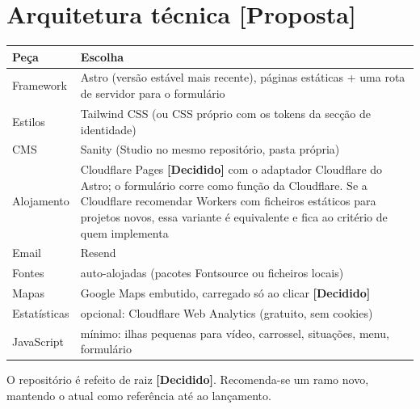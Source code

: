 \documentclass[11pt,a4paper]{article}
\newcommand{\decidido}{\textcolor{verde700}{\textbf{[Decidido]}}}
\newcommand{\proposta}{\textcolor{bronze}{\textbf{[Proposta]}}}
\begin{document}
\section{Arquitetura técnica \proposta}
\begin{center}
\begin{tabularx}{\textwidth}{lX}
\toprule
\textbf{Peça} & \textbf{Escolha} \\
\midrule
Framework & Astro (versão estável mais recente), páginas estáticas + uma rota de servidor para o formulário \\
Estilos & Tailwind CSS (ou CSS próprio com os tokens da secção de identidade) \\
CMS & Sanity (Studio no mesmo repositório, pasta própria) \\
Alojamento & Cloudflare Pages \decidido{} com o adaptador Cloudflare do Astro; o formulário corre como função da Cloudflare. Se a Cloudflare recomendar Workers com ficheiros estáticos para projetos novos, essa variante é equivalente e fica ao critério de quem implementa \\
Email & Resend \\
Fontes & auto-alojadas (pacotes Fontsource ou ficheiros locais) \\
Mapas & Google Maps embutido, carregado só ao clicar \decidido \\
Estatísticas & opcional: Cloudflare Web Analytics (gratuito, sem cookies) \\
JavaScript & mínimo: ilhas pequenas para vídeo, carrossel, situações, menu, formulário \\
\bottomrule
\end{tabularx}
\end{center}
O repositório é refeito de raiz \decidido. Recomenda-se um ramo novo, mantendo o atual como referência até ao lançamento.

\end{document}
